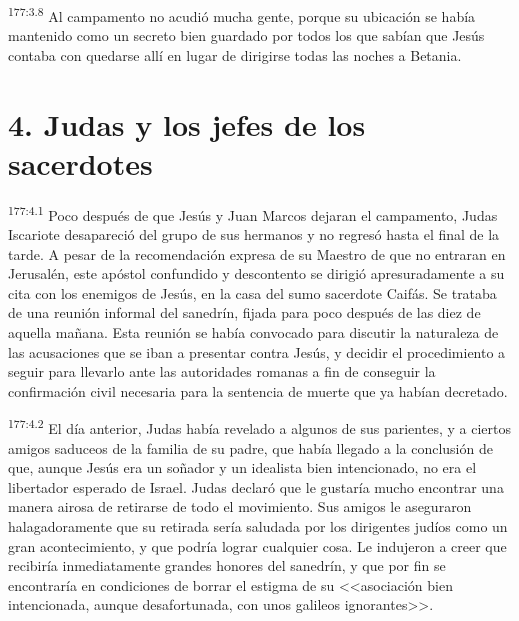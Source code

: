 \par 
\textsuperscript{177:3.8} Al campamento no acudió mucha gente, porque su ubicación se había mantenido como un secreto bien guardado por todos los que sabían que Jesús contaba con quedarse allí en lugar de dirigirse todas las noches a Betania.

\section*{4. Judas y los jefes de los sacerdotes}
\par 
\textsuperscript{177:4.1} Poco después de que Jesús y Juan Marcos dejaran el campamento, Judas Iscariote desapareció del grupo de sus hermanos y no regresó hasta el final de la tarde. A pesar de la recomendación expresa de su Maestro de que no entraran en Jerusalén, este apóstol confundido y descontento se dirigió apresuradamente a su cita con los enemigos de Jesús, en la casa del sumo sacerdote Caifás. Se trataba de una reunión informal del sanedrín, fijada para poco después de las diez de aquella mañana. Esta reunión se había convocado para discutir la naturaleza de las acusaciones que se iban a presentar contra Jesús, y decidir el procedimiento a seguir para llevarlo ante las autoridades romanas a fin de conseguir la confirmación civil necesaria para la sentencia de muerte que ya habían decretado.

\par 
\textsuperscript{177:4.2} El día anterior, Judas había revelado a algunos de sus parientes, y a ciertos amigos saduceos de la familia de su padre, que había llegado a la conclusión de que, aunque Jesús era un soñador y un idealista bien intencionado, no era el libertador esperado de Israel. Judas declaró que le gustaría mucho encontrar una manera airosa de retirarse de todo el movimiento. Sus amigos le aseguraron halagadoramente que su retirada sería saludada por los dirigentes judíos como un gran acontecimiento, y que podría lograr cualquier cosa. Le indujeron a creer que recibiría inmediatamente grandes honores del sanedrín, y que por fin se encontraría en condiciones de borrar el estigma de su <<asociación bien intencionada, aunque desafortunada, con unos galileos ignorantes>>.

